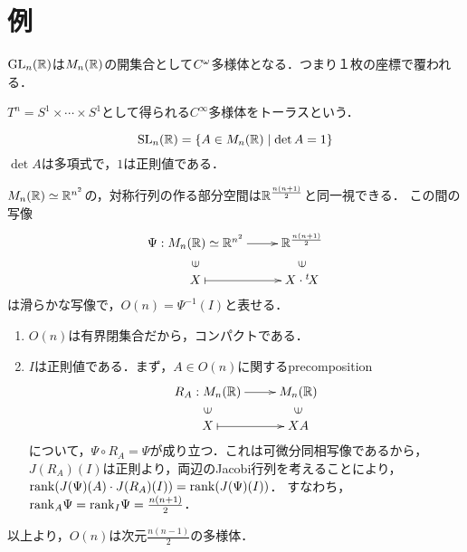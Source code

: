 \documentclass[uplatex,dvipdfmx]{jsreport}
\begin{document}
\section{例}

\begin{example}[開部分多様体$\GL$]
    $\mathrm{GL}_n(\mathbb{R})$は$M_n(\mathbb{R})$の開集合として$C^\omega$多様体となる．つまり１枚の座標で覆われる．
\end{example}

\begin{example}[積多様体$T^n$]
    $T^n=S^1\times\cdots\times S^1$として得られる$C^\infty$多様体をトーラスという．
\end{example}

\begin{example}[代数的多様体$\SL$]
    \[\mathrm{SL}_n(\mathbb{R})=\left\{A\in M_n(\mathbb{R})\mid\det A=1\right\}\]
    $\det A$は多項式で，$1$は正則値である．
\end{example}

\begin{example}[コンパクトなLie群]
    $M_n(\mathbb{R})\simeq\mathbb{R}^{n^2}$の，対称行列の作る部分空間は$\mathbb{R}^{\frac{n(n+1)}{2}}$と同一視できる．
    この間の写像
    \[\xymatrix@R-2pc{
        \Psi:M_n(\R)\simeq\R^{n^2}\ar[r]&\R^{\frac{n(n+1)}{2}}\\
        \rotatebox[origin=c]{90}{$\in$}&\rotatebox[origin=c]{90}{$\in$}\\
        X\ar@{|->}[r]&X\cdot {}^t\!X
    }\]
    は滑らかな写像で，$O(n)=\Psi^{-1}(I)$と表せる．
    \begin{enumerate}
        \item $O(n)$は有界閉集合だから，コンパクトである．
        \item $I$は正則値である．まず，$A\in O(n)$に関するprecomposition
        \[\xymatrix@R-2pc{
            R_A:M_n(\R)\ar[r]&M_n(\R)\\
            \rotatebox[origin=c]{90}{$\in$}&\rotatebox[origin=c]{90}{$\in$}\\
            X\ar@{|->}[r]&XA
        }\]
        について，$\Psi\circ R_A=\Psi$が成り立つ．これは可微分同相写像であるから，$J(R_A)(I)$は正則より，両辺のJacobi行列を考えることにより，$\mathrm{rank}(J(\Psi)(A)\cdot J(R_A)(I))=\mathrm{rank}(J(\Psi)(I))$．
        すなわち，$\mathrm{rank}_A\Psi=\mathrm{rank}_I\Psi=\frac{n(n+1)}{2}$．
    \end{enumerate}
    以上より，$O(n)$は次元$\frac{n(n-1)}{2}$の多様体．
\end{example}
\end{document}
